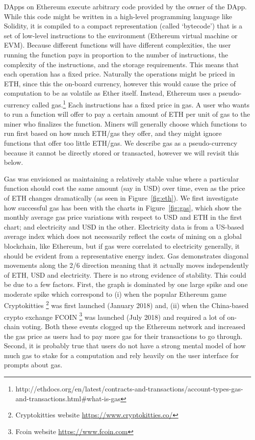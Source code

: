 DApps on Ethereum execute arbitrary code provided by the owner of the DApp. While this code might be written in a high-level programming language like Solidity, it is compiled to a compact representation (called `bytecode') that is a set of low-level instructions to the environment (Ethereum virtual machine or EVM). Because different functions will have different complexities, the user running the function pays in proportion to the number of instructions, the complexity of the instructions, and the storage requirements. This means that each operation has a fixed price. Naturally the operations might be priced in ETH, since this the on-board currency, however this would cause the price of computation to be as volatile as Ether itself. Instead, Ethereum uses a pseudo-currency called gas.\footnote{http://ethdocs.org/en/latest/contracts-and-transactions/account-types-gas-and-transactions.html\#what-is-gas} Each instructions has a fixed price in gas. A user who wants to run a function will offer to pay a certain amount of ETH per unit of gas to the miner who finalizes the function. Miners will generally choose which functions to run first based on how much ETH/gas they offer, and they might ignore functions that offer too little ETH/gas. We describe gas as a pseudo-currency because it cannot be directly stored or transacted, however we will revisit this below.

Gas was envisioned as maintaining a relatively stable value where a particular function should cost the same amount (say in USD) over time, even as the price of ETH changes dramatically (as seen in Figure~\ref{fig:eth}). We first investigate how successful gas has been with the charts in Figure~\ref{fig:gas}, which show the monthly average gas price variations with respect to USD and ETH in the first chart; and electricity and USD in the other. Electricity data is from a US-based average index which does not necessarily reflect the costs of mining on a global blockchain, like Ethereum, but if gas were correlated to electricity generally, it should be evident from a representative energy index. Gas demonstrates diagonal movements along the 2/6 direction meaning that it actually moves independently of ETH, USD and electricity. There is no strong evidence of stability. This could be due to a few factors. First, the graph is dominated by one large spike and one moderate spike which correspond to (i) when the popular Ethereum game Cryptokitties \footnote{Cryptokitties website \url{https://www.cryptokitties.co/}} was first launched (January 2018) and, (ii) when the China-based crypto exchange FCOIN \footnote{Fcoin website \url{https://www.fcoin.com}} was launched (July 2018) and required a lot of on-chain voting. Both these events  clogged up the Ethereum network and increased the gas price as users had to pay more gas for their transactions to go through. Second, it is probably true that users do not have a strong mental model of how much gas to stake for a computation and rely heavily on the user interface for prompts about gas.

